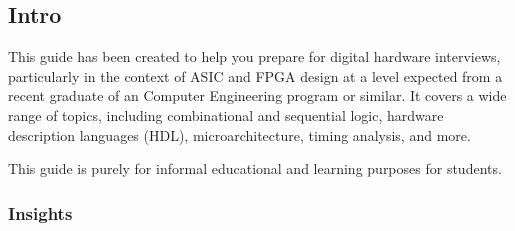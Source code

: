 \subsection*{Intro}

This guide has been created to help you prepare for digital hardware
interviews, particularly in the context of ASIC and FPGA design at a level
expected from a recent graduate of an Computer Engineering program or similar.
It covers a wide range of topics, including combinational and sequential logic,
hardware description languages (HDL), microarchitecture, timing analysis, and
more.

This guide is purely for informal educational and learning purposes for students.

\subsubsection*{Insights}

